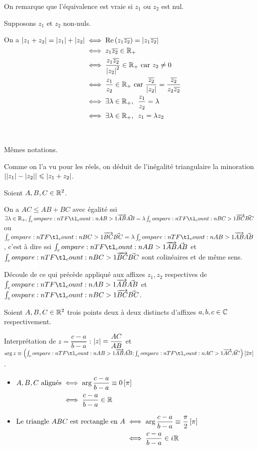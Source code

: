 \begin{dem}
On remarque que l'équivalence est vraie si \(z_1\) ou \(z_2\) est nul.

Supposons \(z_1\) et \(z_2\) non-nuls.

On a \(\begin{aligned}[t]
\abs{z_1+z_2}=\abs{z_1}+\abs{z_2}&\ssi\Re\paren{z_1\conj{z_2}}=\abs{z_1\conj{z_2}} \\
&\ssi z_1\conj{z_2}\in\Rp \\
&\ssi\dfrac{z_1\conj{z_2}}{\abs{z_2}^2}\in\Rp\text{ car }z_2\not=0 \\
&\ssi\dfrac{z_1}{z_2}\in\Rp\text{ car }\dfrac{\conj{z_2}}{\abs{z_2}}=\dfrac{\conj{z_2}}{z_2\conj{z_2}} \\
&\ssi\quantifs{\exists\lambda\in\Rp}\dfrac{z_1}{z_2}=\lambda \\
&\ssi\quantifs{\exists\lambda\in\Rp}z_1=\lambda z_2
\end{aligned}\)

~
\end{dem}

\begin{rem}
Mêmes notations.

Comme on l'a vu pour les réels, on déduit de l'inégalité triangulaire la minoration \(\left\lvert\left\lvert z_1\right\rvert-\left\lvert z_2\right\rvert\right\rvert\leqslant\left\lvert z_1+z_2\right\rvert\).
\end{rem}

\begin{cor}
Soient \(A,B,C\in\mathbb{R}^2\).

On a \(AC\leq AB+BC\) avec égalité ssi \(\exists\lambda\in\Rp,\v{AB}=\lambda\v{BC}\) ou \(\v{BC}=\lambda\v{AB}\), c'est à dire ssi \(\v{AB}\) et \(\v{BC}\) sont colinéaires et de même sens.
\end{cor}

\begin{dem}
Découle de ce qui précède appliqué aux affixes \(z_1,z_2\) respectives de \(\v{AB}\) et \(\v{BC}\).
\end{dem}

\begin{prop}
Soient \(A,B,C\in\mathbb{R}^2\) trois points deux à deux distincts d'affixes \(a,b,c\in\mathbb{C}\) respectivement.

Interprétation de \(z=\dfrac{c-a}{b-a}\) : \(\left\lvert z\right\rvert=\dfrac{AC}{AB}\) et \(\arg z\equiv\paren{\v{AB};\v{AC}}\croch{2\pi}\).
\end{prop}

\begin{ex}
\begin{itemize}
\item \(\begin{aligned}[t]
A,B,C\text{ alignés}&\iff\arg\dfrac{c-a}{b-a}\equiv0\left[\pi\right] \\
&\iff\dfrac{c-a}{b-a}\in\mathbb{R}
\end{aligned}\)

\item \(\begin{aligned}[t]
\text{Le triangle }ABC\text{ est rectangle en }A&\iff\arg\dfrac{c-a}{b-a}\equiv\dfrac{\pi}{2}\left[\pi\right] \\
&\iff\dfrac{c-a}{b-a}\in i\mkern1mu\mathbb{R}
\end{aligned}\)
\end{itemize}
\end{ex}

